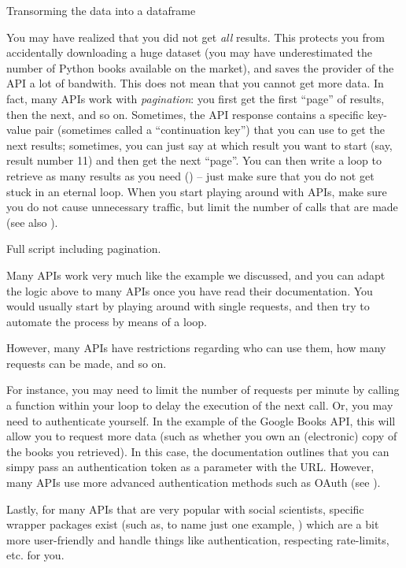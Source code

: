 \begin{ccsexample}
  \caption{Transorming the data into a dataframe}\label{ex:googleapi2}
\end{ccsexample}

You may have realized that you did not get \emph{all} results.
This protects you from accidentally downloading a huge dataset (you
may have underestimated the number of Python books available on the
market), and saves the provider of the API a lot of bandwith.
This does not mean that you cannot get more data. In fact, many APIs work
with \emph{pagination}: you first get the first ``page'' of results,
then the next, and so on. Sometimes, the API response contains
a specific key-value pair (sometimes called a ``continuation key'')
that you can use to get the next results; sometimes, you can just
say at which result you want to start (say, result number 11) and
then get the next ``page''. You can then write a loop to retrieve
as many results as you need () -- just make sure
that you do not get stuck in an eternal loop. When you start playing
around with APIs, make sure you do not cause unnecessary traffic,
but limit the number of calls that are made (see also ).


\begin{ccsexample}
  \caption{Full script including pagination.}\label{ex:googleapi3}
\end{ccsexample}



Many APIs work very much like the example we discussed, and you
can adapt the logic above to many APIs once you have read their
documentation. You would usually start by playing around with
single requests, and then try to automate the process by means
of a loop.

However, many APIs have restrictions regarding who can use them,
how many requests can be made, and so on.

For instance, you may need to limit the number of requests per minute
by calling a  function within your loop to delay the
execution of the next call. Or, you may need to authenticate
yourself. In the example of the Google Books API, this will
allow you to request more data (such as whether you own an
(electronic) copy of the books you retrieved). In this case,
the documentation outlines that you can simpy pass an authentication
token as a parameter with the URL. However, many APIs use
more advanced authentication methods such as OAuth (see ).

Lastly, for many APIs that are very popular with social
scientists, specific wrapper packages exist (such as, to name just one example, )
which are a bit more user-friendly and handle things like authentication,
respecting rate-limits, etc. for you.
